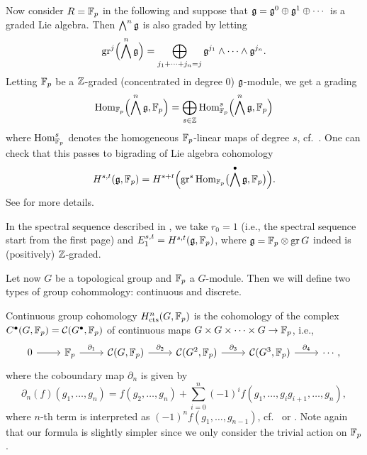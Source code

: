 Now consider $R=\mathbb{F}_{p}$ in the following and suppose that $\mathfrak{g} = \mathfrak{g}^0 \oplus \mathfrak{g}^1 \oplus \dotsb$ is a graded Lie algebra. Then $\bigwedge^n \mathfrak{g}$ is also graded by letting
\[
  \operatorname{gr}^j\Bigl( \bigwedge^n \mathfrak{g} \Bigr) = \bigoplus_{j_1+\dotsb+j_n = j} \mathfrak{g}^{j_1} \wedge \dotsb \wedge \mathfrak{g}^{j_n}.
\]
Letting $\mathbb{F}_{p}$ be a $\mathbb{Z}$-graded (concentrated in degree $0$) $\mathfrak{g}$-module, we get a grading
\[
  \operatorname{Hom}_{\mathbb{F}_{p}}\Bigl( \bigwedge^n \mathfrak{g}, \mathbb{F}_{p} \Bigr) = \bigoplus_{s \in \mathbb{Z}} \operatorname{Hom}_{\mathbb{F}_{p}}^s\Bigl( \bigwedge^n\mathfrak{g}, \mathbb{F}_{p} \Bigr)
\]
where $\operatorname{Hom}_{\mathbb{F}_{p}}^s$ denotes the homogeneous $\mathbb{F}_{p}$-linear maps of degree $s$, cf.\ \cite[Lem.~4.2]{Fossum}. One can check that this passes to bigrading of Lie algebra cohomology
\begin{equation*}
  H^{s,t}(\mathfrak{g}, \mathbb{F}_{p}) = H^{s+t}\Bigl( \operatorname{gr}^s \operatorname{Hom}_{\mathbb{F}_{p}}\bigl(\bigwedge^{\bullet} \mathfrak{g}, \mathbb{F}_{p} \bigr) \Bigr).
\end{equation*}%
%
See \cite[§3]{Fuks} for more details.

In the spectral sequence described in \cite[§6.1]{Sor}, we take $r_{0} = 1$ (i.e., the spectral sequence start from the first page) and $E_{1}^{s,t} = H^{s,t}(\mathfrak{g}, \mathbb{F}_{p})$, where $\mathfrak{g} = \mathbb{F}_{p} \otimes \operatorname{gr} G$ indeed is (positively) $\mathbb{Z}$-graded.

Let now $G$ be a topological group and $\mathbb{F}_{p}$ a $G$-module. Then we will define two types of group cohommology: continuous and discrete.

Continuous group cohomology $H_{\mathrm{cts}}^{n}(G,\mathbb{F}_{p})$ is the cohomology of the complex $C^{\bullet}(G,\mathbb{F}_{p}) = \mathcal{C}(G^{\bullet},\mathbb{F}_{p})$ of continuous maps $G \times G \times \dotsb \times G \to \mathbb{F}_{p}$, i.e.,
\[
  \begin{tikzcd}
    0 \ar[r] & \F_{p} \ar[r,"\partial_{1}"] & \Cont(G, \F_{p}) \ar[r,"\partial_{2}"] & \Cont(G^{2}, \F_{p}) \ar[r,"\partial_{3}"] &  \Cont(G^{3},\F_{p}) \ar[r,"\partial_{4}"] & \cdots,
  \end{tikzcd}
\]
where the coboundary map $\partial_{n}$ is given by
\begin{equation}\label{eq:group-coh-d}
  \partial_{n}(f)(g_{1},\dotsc,g_{n}) = f(g_{2},\dotsc,g_{n}) + \sum_{i=0}^{n}(-1)^{i}f(g_{1},\dotsc,g_{i}g_{i+1},\dotsc,g_{n}),
\end{equation}
where $n$-th term is interpreted as $(-1)^{n}f(g_{1},\dotsc,g_{n-1})$, cf.\ \cite[§3]{Sor} or \cite[§2]{GalCoh}. Note again that our formula is slightly simpler since we only consider the trivial action on $\mathbb{F}_{p}$.

